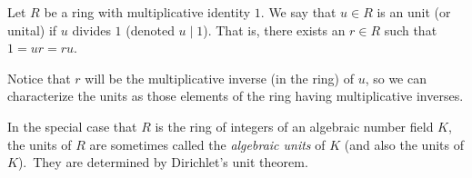 \documentclass[12pt]{article}
\begin{document}
Let $R$ be a ring with multiplicative identity $1$. We say that $u\in R$ is an unit (or unital) if $u$ divides $1$ (denoted $u \mid 1$). That is, there exists an $r\in R$  such that $1=ur=ru$.

Notice that $r$ will be the multiplicative inverse (in the ring) of $u$, so we can characterize the units as those elements of the ring having multiplicative inverses.

In the special case  that $R$ is the ring of integers of an algebraic number field $K$, the units of $R$ are sometimes called the {\em algebraic units} of $K$ (and also the units of $K$).\, They are determined by Dirichlet's unit theorem.
\end{document}
